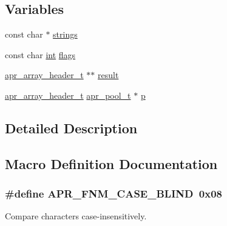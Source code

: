 \subsection*{Variables}
\begin{DoxyCompactItemize}
\item 
const char $\ast$ \hyperlink{group__apr__fnmatch_ga6bd51e9b0d3b446565e6e777ec78376c}{strings}
\item 
const char \hyperlink{pcre_8txt_a42dfa4ff673c82d8efe7144098fbc198}{int} \hyperlink{group__apr__fnmatch_ga3e6d697dc0ff44866a7ba96989912775}{flags}
\item 
\hyperlink{structapr__array__header__t}{apr\+\_\+array\+\_\+header\+\_\+t} $\ast$$\ast$ \hyperlink{group__apr__fnmatch_ga5870bc70d0e7e1e79ec7b4c512a92c4b}{result}
\item 
\hyperlink{structapr__array__header__t}{apr\+\_\+array\+\_\+header\+\_\+t} \hyperlink{structapr__pool__t}{apr\+\_\+pool\+\_\+t} $\ast$ \hyperlink{group__apr__fnmatch_ga4aaa19306a024e92edb34e88100061f6}{p}
\end{DoxyCompactItemize}


\subsection{Detailed Description}


\subsection{Macro Definition Documentation}
\subsubsection[{\texorpdfstring{A\+P\+R\+\_\+\+F\+N\+M\+\_\+\+C\+A\+S\+E\+\_\+\+B\+L\+I\+ND}{APR_FNM_CASE_BLIND}}]{\setlength{\rightskip}{0pt plus 5cm}\#define A\+P\+R\+\_\+\+F\+N\+M\+\_\+\+C\+A\+S\+E\+\_\+\+B\+L\+I\+ND~0x08}\hypertarget{group__apr__fnmatch_ga5cee1c0a917a283a193721d11160b502}{}\label{group__apr__fnmatch_ga5cee1c0a917a283a193721d11160b502}
Compare characters case-\/insensitively. 
